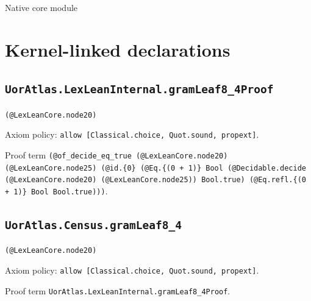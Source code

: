\documentclass[11pt]{article}
\begin{document}
\begin{center}{\LARGE Native core module}\end{center}
\section*{Kernel-linked declarations}
\subsection*{\texttt{UorAtlas.LexLeanInternal.gramLeaf8\_4Proof}}
\noindent\texttt{(@LexLeanCore.node20)}\par
\noindent Axiom policy: \texttt{allow [Classical.choice, Quot.sound, propext]}.\par
\noindent Proof term \texttt{(@of\_decide\_eq\_true (@LexLeanCore.node20) (@LexLeanCore.node25) (@id.\{0\} (@Eq.\{(0 + 1)\} Bool (@Decidable.decide (@LexLeanCore.node20) (@LexLeanCore.node25)) Bool.true) (@Eq.refl.\{(0 + 1)\} Bool Bool.true)))}.\par
\subsection*{\texttt{UorAtlas.Census.gramLeaf8\_4}}
\noindent\texttt{(@LexLeanCore.node20)}\par
\noindent Axiom policy: \texttt{allow [Classical.choice, Quot.sound, propext]}.\par
\noindent Proof term \texttt{UorAtlas.LexLeanInternal.gramLeaf8\_4Proof}.\par
\end{document}
